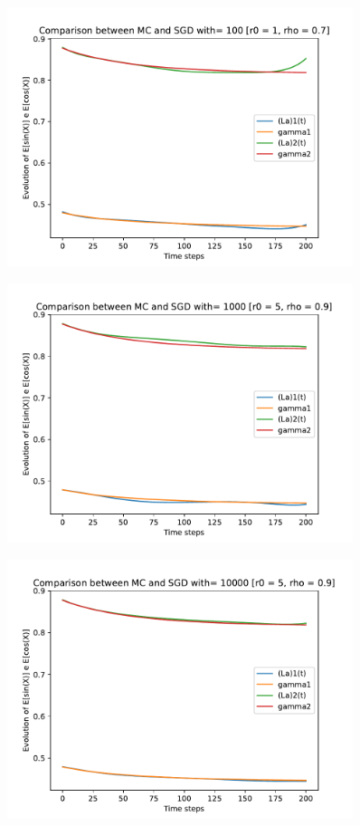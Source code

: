 \documentclass[a4paper,11pt,openright]{report}
\begin{document}
\begin{figure}[H]
\centering
\includegraphics[width=0.9\textwidth]{images/graphics T = 2/n = 6, M = 100 sine and cosine.pdf}
\end{figure}
\begin{figure}[H]
\centering
\includegraphics[width=0.9\textwidth]{images/graphics T = 2/n = 6, M = 1000 sine and cosine.pdf}
\end{figure}
\begin{figure}[H]
\centering
\includegraphics[width=0.9\textwidth]{images/graphics T = 2/n = 6, M = 10000 sine and cosine.pdf}
\end{figure}
\newpage
\end{document}
